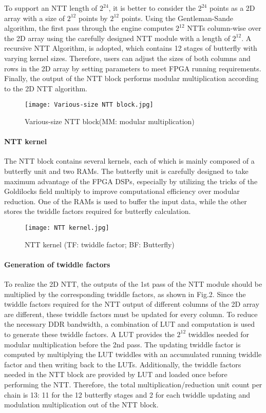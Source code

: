 To support an NTT length of $2^{24}$, it is better to consider the $2^{24}$ points as a 2D array with a size of $2^{12}$ points by $2^{12}$ points. Using the Gentleman-Sande algorithm, the first pass through the engine computes $2^{12}$ NTTs column-wise over the 2D array using the carefully designed NTT module with a length of $2^{12}$. A recursive NTT Algorithm, is adopted, which contains 12 stages of butterfly with varying kernel sizes. Therefore, users can adjust the sizes of both columns and rows in the 2D array by setting parameters to meet FPGA running requirements. Finally, the output of the NTT block performs modular multiplication according to the 2D NTT algorithm.

\begin{figure}[ht]
  \centering
  \texttt{[image: Various-size NTT block.jpg]}
  \caption{Various-size NTT block(MM: modular multiplication)}
  \label{fig:NTT_module}
\end{figure}

\paragraph{NTT kernel}
The NTT block contains several kernels, each of which is mainly composed of a butterfly unit and two RAMs. The butterfly unit is carefully designed to take maximum advantage of the FPGA DSPs, especially by utilizing the tricks of the Goldilocks field multiply to improve computational efficiency over modular reduction. One of the RAMs is used to buffer the input data, while the other stores the twiddle factors required for butterfly calculation.


\begin{figure}[ht]
  \centering
  \texttt{[image: NTT kernel.jpg]}
  \caption{NTT kernel (TF: twiddle factor; BF: Butterfly)}
  \label{fig:NTT_kernel}
\end{figure}

\paragraph{Generation of twiddle factors}

To realize the 2D NTT, the outputs of the 1st pass of the NTT module should be multiplied by the corresponding twiddle factors, as shown in Fig.2. Since the twiddle factors required for the NTT output of different columns of the 2D array are different, these twiddle factors must be updated for every column. To reduce the necessary DDR bandwidth, a combination of LUT and computation is used to generate these twiddle factors. A LUT provides the $2^{12}$ twiddles needed for modular multiplication before the 2nd pass. The updating twiddle factor is computed by multiplying the LUT twiddles with an accumulated running twiddle factor and then writing back to the LUTs. Additionally, the twiddle factors needed in the NTT block are provided by LUT and loaded once before performing the NTT. Therefore, the total multiplication/reduction unit count per chain is 13: 11 for the 12 butterfly stages and 2 for each twiddle updating and modulation multiplication out of the NTT block.

